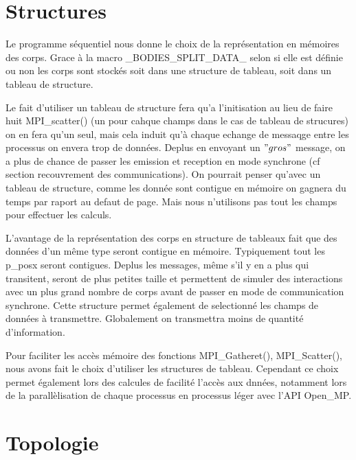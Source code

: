 \section{Structures}

\par Le programme séquentiel nous donne le choix de la représentation en mémoires des 
corps. Grace à la macro \_BODIES\_SPLIT\_DATA\_ selon si elle est définie ou non 
les corps sont stockés soit dans une structure de tableau, soit dans un tableau de structure.\\

\par Le fait d'utiliser un tableau de structure fera qu'a l'initisation au lieu de faire huit 
MPI\_scatter() (un pour cahque champs dans le cas de tableau de strucures) on en fera qu'un seul,
mais cela induit qu'à chaque echange de messaqge entre les processus on envera trop de données.
Deplus en envoyant un $"gros"$ message, on a plus de chance de passer les emission et reception en mode
synchrone (cf section recouvrement des communications). On pourrait penser qu'avec un tableau de structure,
comme les donnée sont contigue en mémoire on gagnera du temps par raport au defaut de page. Mais 
nous n'utilisons pas tout les champs pour effectuer les calculs.

\par L'avantage de la représentation des corps en structure de tableaux fait que des données d'un même
type seront contigue en mémoire. Typiquement tout les p\_posx seront contigues. Deplus les messages, 
même s'il y en a plus qui transitent, seront de plus petites taille et permettent de simuler des 
interactions avec un plus grand nombre de corps avant de passer en mode de communication synchrone.
Cette structure permet également de selectionné les champs de données à transmettre. Globalement 
on transmettra moins de quantité d'information.

\par Pour faciliter les accès mémoire des fonctions MPI\_Gatheret(), MPI\_Scatter(), nous avons fait le 
choix d'utiliser les structures de tableau. Cependant ce choix permet également lors des calcules
de facilité l'accès aux dnnées, notamment lors de la parallèlisation de chaque processus en processus 
léger avec l'API Open\_MP.\\

\section{Topologie}


